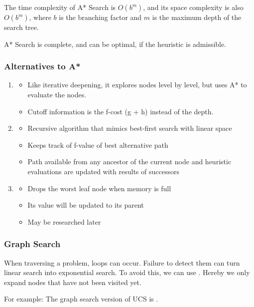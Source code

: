 \documentclass[
../../EiKI_Summary.tex,
]
{subfiles}
\begin{document}
 The time complexity of A* Search is $O(b^m)$, and its space complexity is also $O(b^m)$, where $b$ is the branching factor and $m$ is the maximum depth of the search tree.

 A* Search is complete, and can be optimal, if the heuristic is admissible.

\subsubsection{Alternatives to A*}
\begin{enumerate}
    \item {}
    \begin{itemize}
        \item Like iterative deepening, it explores nodes level by level, but uses A* to evaluate the nodes.
        \item Cutoff information is the f-cost (g + h) instead of the depth.
    \end{itemize}
    \item {}
    \begin{itemize}
        \item Recursive algorithm that mimics best-first search with linear space
        \item Keeps track of f-value of best alternative path
        \item Path available from any ancestor of the current node and heuristic evaluations are updated with results of successors
    \end{itemize}
    \item {}
    \begin{itemize}
        \item Drops the worst leaf node when memory is full
        \item Its value will be updated to its parent
        \item May be researched later
    \end{itemize}
\end{enumerate}

\subsubsection{Graph Search}
When traversing a problem, loops can occur. Failure to detect them can turn linear search into exponential search.
To avoid this, we can use . Hereby we only expand nodes that have not been visited yet.

For example: The graph search version of UCS is .
\end{document}

